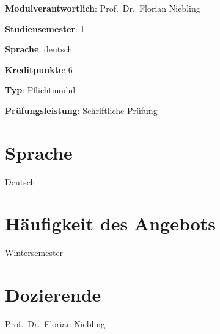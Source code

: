 \begin{modulHead}
\textbf{Modulverantwortlich}: Prof.~Dr.~Florian
Niebling
\end{modulHead}
\begin{modulHead}
\textbf{Studiensemester}:
1
\end{modulHead}
\begin{modulHead}
\textbf{Sprache}:
deutsch
\end{modulHead}
\begin{modulHead}
\textbf{Kreditpunkte}:
6
\end{modulHead}
\begin{modulHead}
\textbf{Typ}:
Pflichtmodul
\end{modulHead}
\begin{modulHead}
\textbf{Prüfungsleistung}:
Schriftliche Prüfung
\end{modulHead}


\hypertarget{sprachepathlabel....srcmodulbeschreibungen-bachelor-bpo5ba_theoretischeinformatik}{%
\section*{Sprache\label{../../src/modulbeschreibungen-bachelor-bpo5/BA_TheoretischeInformatik}}\label{sprachepathlabel....srcmodulbeschreibungen-bachelor-bpo5ba_theoretischeinformatik}}

Deutsch

\hypertarget{huxe4ufigkeit-des-angebotspathlabel....srcmodulbeschreibungen-bachelor-bpo5ba_theoretischeinformatik}{%
\section*{Häufigkeit des
Angebots\label{../../src/modulbeschreibungen-bachelor-bpo5/BA_TheoretischeInformatik}}\label{huxe4ufigkeit-des-angebotspathlabel....srcmodulbeschreibungen-bachelor-bpo5ba_theoretischeinformatik}}

Wintersemester

\hypertarget{dozierendepathlabel....srcmodulbeschreibungen-bachelor-bpo5ba_theoretischeinformatik}{%
\section*{Dozierende\label{../../src/modulbeschreibungen-bachelor-bpo5/BA_TheoretischeInformatik}}\label{dozierendepathlabel....srcmodulbeschreibungen-bachelor-bpo5ba_theoretischeinformatik}}

Prof.~Dr.~Florian Niebling

